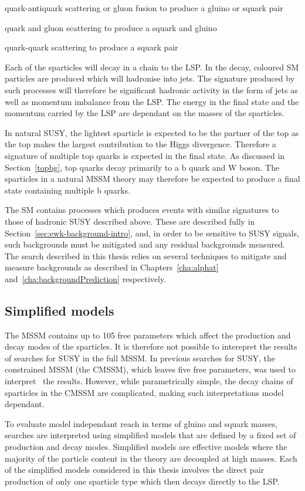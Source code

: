 \item quark-antiquark scattering or gluon fusion to produce a gluino or squark pair
\item quark and gluon scattering to produce a squark and gluino
\item quark-quark scattering to produce a squark pair

Each of the sparticles will decay in a chain to the LSP. In the decay, 
coloured SM particles are produced which will hadronise into jets.
The signature produced by such processes will therefore be significant hadronic activity in 
the form of jets as well as momentum imbalance from the LSP. The energy in
the final state and the momentum carried by the LSP are dependant on the masses
of the sparticles.

In natural SUSY, the lightest sparticle is expected to be the partner of the top
as the top makes the largest contribution to the Higgs divergence. Therefore a signature
of multiple top quarks is expected in the final state. As discussed in Section~\ref{topbg}, top quarks
decay primarily to a b quark and W boson. The sparticles in a natural MSSM theory may therefore be expected
to produce a final state containing multiple b quarks.

The SM contains processes which produces events with similar signatures to 
those of hadronic SUSY described above. These are described fully in Section~\ref{sec:ewk-background-intro},
and, in order to be sensitive to SUSY signals, such backgrounds must be mitigated 
and any residual backgrounds measured. The search described in this thesis relies on several
techniques to mitigate and measure backgrounds as described in Chapters~\ref{cha:alphat} and~\ref{cha:backgroundPrediction}
respectively.

\subsection{Simplified models}

The MSSM contains up to 105 free parameters which affect the production and decay modes of the sparticles.
It is therefore not possible to interepret the results of searches for SUSY in the full MSSM. 
In previous searches for SUSY, the constrained MSSM (the CMSSM), which leaves five free parameters, was 
used to interpret~\cite{SMS} the results. However, while parametrically simple, the decay chains of sparticles 
in the CMSSM are complicated, making such interpretations model dependant. 

To evaluate model independant reach in terms of gluino and squark masses, searches are interpreted using 
simplified models that are defined by a fixed set of production and decay modes.
Simplified models are effective models where the majority of the particle content in the theory 
are decoupled at high masses. Each of the simplified models considered in this thesis involves
the direct pair production of only one sparticle type which then decays directly to the LSP.

